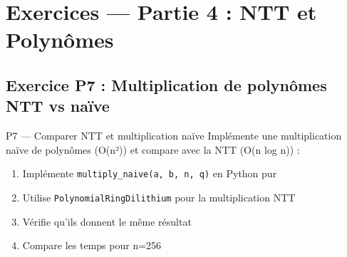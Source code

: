 \documentclass[12pt, a4paper]{article}
\begin{document}
\newpage
\section{Exercices --- Partie 4 : NTT et Polynômes}

\subsection{Exercice P7 : Multiplication de polynômes NTT vs naïve}

\begin{exercice}{P7 --- Comparer NTT et multiplication naïve}
Implémente une multiplication naïve de polynômes (O(n²)) et compare avec la NTT (O(n log n)) :
\begin{enumerate}
  \item Implémente \texttt{multiply\_naive(a, b, n, q)} en Python pur
  \item Utilise \texttt{PolynomialRingDilithium} pour la multiplication NTT
  \item Vérifie qu'ils donnent le même résultat
  \item Compare les temps pour n=256
\end{enumerate}
\end{exercice}
\end{document}
